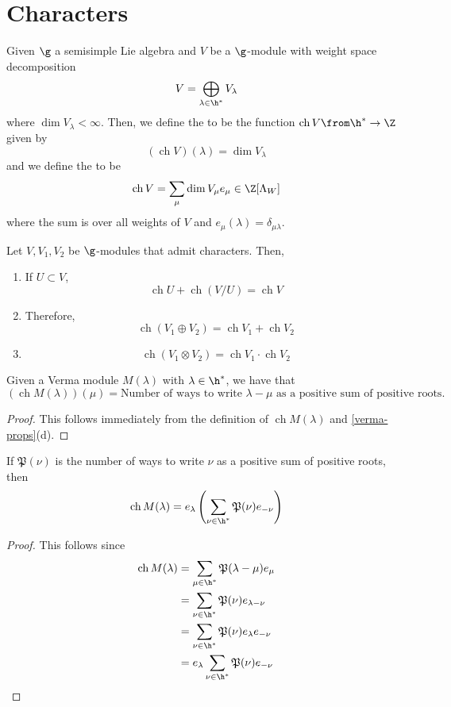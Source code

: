 \documentclass[11pt,leqno,oneside]{amsart}
\numberwithin{thm}{section}
\newcommand{\weightlattice}{\Lambda_W}
\newcommand{\ch}{\operatorname{ch}}
\newcommand{\numposrootcombos}{\mathfrak{P}}
\begin{document}
\section{Characters}
\begin{defn}
  Given \(\g\) a semisimple Lie algebra and \(V\) be a
  \(\g\)-module with weight space decomposition \[
    V = \bigoplus_{\lambda \in \h^*} V_\lambda
  \]
  where \(\dim V_{\lambda} < \infty\). Then, we define the  to be the function \(\ch V \from \h^* \to \Z\) given by \[
    (\ch V)(\lambda) = \dim V_{\lambda}
  \]
  and we define the  to be \[
    \ch V = \sum_{\mu} \dim V_{\mu} e_\mu \in \Z[\weightlattice] 
  \]
  where the sum is over all weights of \(V\) and \(e_\mu(\lambda) =
  \delta_{\mu \lambda}\).
\end{defn}
\begin{prop}
  Let \(V,V_1,V_2\) be \(\g\)-modules that admit characters. Then,
  \begin{enumerate}
  \item If \(U \subset V\), \[
      \ch U + \ch(V/U) = \ch V
    \]
  \item Therefore, \[
      \ch(V_1 \oplus V_2) = \ch V_1 + \ch V_2
    \]
  \item \[
      \ch(V_1 \otimes V_2) = \ch V_1 \cdot \ch V_2
    \]
  \end{enumerate}
\end{prop}
\begin{lem}
  Given a Verma module \(M(\lambda)\) with \(\lambda \in \h^*\), we
  have that \[
    (\ch M(\lambda))(\mu) = \text{Number of ways to write
    }\lambda-\mu\text{ as a positive sum of positive roots.}
  \]
\end{lem}
\begin{proof}
  This follows immediately from the definition of \(\ch M(\lambda)\)
  and \ref{verma-props}(d).
\end{proof}
\begin{prop}
  If \(\numposrootcombos(\nu)\) is the number of ways to write \(\nu\)
  as a positive sum of positive roots, then \[
    \ch M(\lambda) = e_\lambda \left( \sum_{\nu \in \h^*}
      \numposrootcombos(\nu)e_{-\nu} \right) 
  \]
\end{prop}
\begin{proof}
  This follows since
  \begin{align*}
    \ch M(\lambda)
    & = \sum_{\mu \in \h^*} \numposrootcombos(\lambda-\mu)e_{\mu}\\
    & = \sum_{\nu \in \h^*} \numposrootcombos(\nu)e_{\lambda-\nu}\\
    & = \sum_{\nu \in \h^*}
    \numposrootcombos(\nu)e_{\lambda}e_{-\nu}\\
    & = e_{\lambda} \sum_{\nu \in \h^*} \numposrootcombos(\nu)e_{-\nu}
  \end{align*}
\end{proof}
\end{document}

